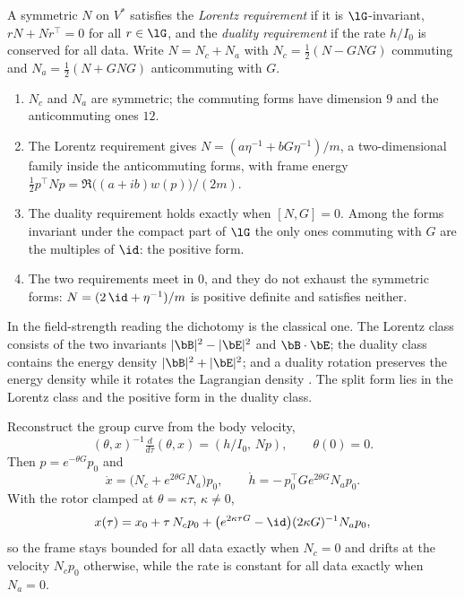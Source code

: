 \begin{definition}
\label{def:inertiareq}
A symmetric $N$ on $V^*$ satisfies the \emph{Lorentz requirement} if it is $\lG$-invariant, $rN+Nr^{\!\top}=0$ for all $r\in\lG$, and the
\emph{duality requirement} if the rate $h/I_0$ is conserved for all data. Write $N=N_c+N_a$ with $N_c=\tfrac12(N-GNG)$ commuting and
$N_a=\tfrac12(N+GNG)$ anticommuting with $G$.
\end{definition}

\begin{theorem}
\label{thm:inertiareq}
\begin{enumerate}[label=(\roman*),leftmargin=2.2em]
\item $N_c$ and $N_a$ are symmetric; the commuting forms have dimension $9$ and the anticommuting ones $12$.
\item The Lorentz requirement gives $N=(a\eta^{-1}+bG\eta^{-1})/m$, a two-dimensional family inside the anticommuting forms, with frame energy
$\tfrac12p^{\!\top}Np=\Re\bigl((a+ib)w(p)\bigr)/(2m)$.
\item The duality requirement holds exactly when $[N,G]=0$. Among the forms invariant under the compact part of $\lG$ the only ones commuting with
$G$ are the multiples of $\id$: the positive form.
\item The two requirements meet in $0$, and they do not exhaust the symmetric forms: $N=(2\,\id+\eta^{-1})/m$ is positive definite and satisfies
neither.
\end{enumerate}
\end{theorem}

In the field-strength reading the dichotomy is the classical one. The Lorentz class consists of the two invariants $|\bB|^2-|\bE|^2$ and
$\bB\cdot\bE$; the duality class contains the energy density $|\bB|^2+|\bE|^2$; and a duality rotation preserves the energy density while it
rotates the Lagrangian density \cite{Calkin65,DeserTeitelboim76,GaillardZumino81}. The split form lies in the Lorentz class and the positive form
in the duality class.

\begin{theorem}
\label{thm:drift}
Reconstruct the group curve from the body velocity,
\[
(\theta,x)^{-1}\tfrac{d}{d\tau}(\theta,x)=(h/I_0,\,Np),\qquad \theta(0)=0 .
\]
Then $p=e^{-\theta G}p_0$ and
\[
\dot x=\bigl(N_c+e^{2\theta G}N_a\bigr)p_0,\qquad \dot h=-\,p_0^{\!\top}Ge^{2\theta G}N_ap_0 .
\]
With the rotor clamped at $\theta=\kappa\tau$, $\kappa\neq0$,
\[
x(\tau)=x_0+\tau\,N_cp_0+\bigl(e^{2\kappa\tau G}-\id\bigr)(2\kappa G)^{-1}N_ap_0 ,
\]
so the frame stays bounded for all data exactly when $N_c=0$ and drifts at the velocity $N_cp_0$ otherwise, while the rate is constant for all data
exactly when $N_a=0$.
\end{theorem}

